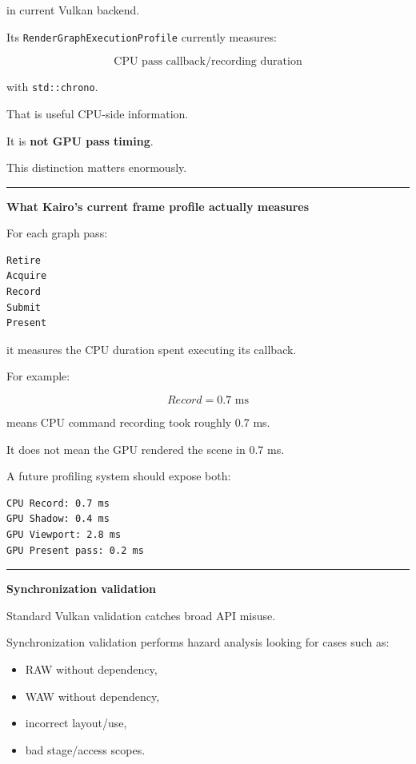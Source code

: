 in current Vulkan backend.

Its \texttt{RenderGraphExecutionProfile} currently measures:

\[
\boxed{\text{CPU pass callback/recording duration}}
\]

with \texttt{std::chrono}.

That is useful CPU-side information.

It is \textbf{not GPU pass timing}.

This distinction matters enormously.

\begin{center}\rule{0.5\linewidth}{0.5pt}\end{center}

\textbf{What Kairo's current frame profile actually measures}

For each graph pass:

\begin{verbatim}
Retire
Acquire
Record
Submit
Present
\end{verbatim}

it measures the CPU duration spent executing its callback.

For example:

\[
Record=0.7\text{ ms}
\]

means CPU command recording took roughly 0.7 ms.

It does not mean the GPU rendered the scene in 0.7 ms.

A future profiling system should expose both:

\begin{verbatim}
CPU Record: 0.7 ms
GPU Shadow: 0.4 ms
GPU Viewport: 2.8 ms
GPU Present pass: 0.2 ms
\end{verbatim}

\begin{center}\rule{0.5\linewidth}{0.5pt}\end{center}

\textbf{Synchronization validation}

Standard Vulkan validation catches broad API misuse.

Synchronization validation performs hazard analysis looking for cases such as:

\begin{itemize}
\tightlist
\item
  RAW without dependency,
\item
  WAW without dependency,
\item
  incorrect layout/use,
\item
  bad stage/access scopes.
\end{itemize}

